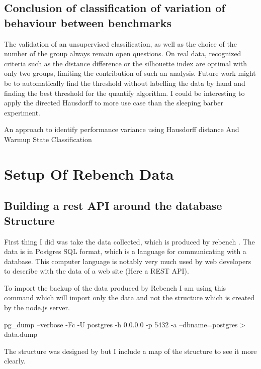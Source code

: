 \documentclass{article}
\begin{document}
\subsection{Conclusion of classification of variation of behaviour between benchmarks}

The validation of an unsupervised classification, as well as the choice of the number of the group always remain open questions. On real data, recognized criteria such as the distance difference or the silhouette index are optimal with only two groups, limiting the contribution of such an analysis.
Future work might be to automatically find the threshold without labelling the data by hand and finding the best threshold for the quantify algorithm.
I could be interesting to apply the directed Hausdorff to more use case than the sleeping barber experiment.


An approach to identify performance variance using Hausdorff distance And Warmup State Classification



\section{Setup Of Rebench Data}

\subsection{Building a rest API around the database Structure}

First thing I did was take the data collected, which is produced by rebench \cite{ReBench:2018}. The data is in Postgres SQL format, which is a language for communicating with a database. This computer language is notably very much used by web developers to describe with the data of a web site (Here a REST API).

To import the backup of the data produced by Rebench I am using this command which will import only the data and not the structure which is created by the node.js server.

\begin{python}[h!]
pg_dump --verbose -Fc -U postgres -h 0.0.0.0 -p 5432  -a --dbname=postgres > data.dump
\end{python}

The structure was designed by \cite{ReBench:2018} but I include a map of the structure to see it more clearly.
\end{document}
